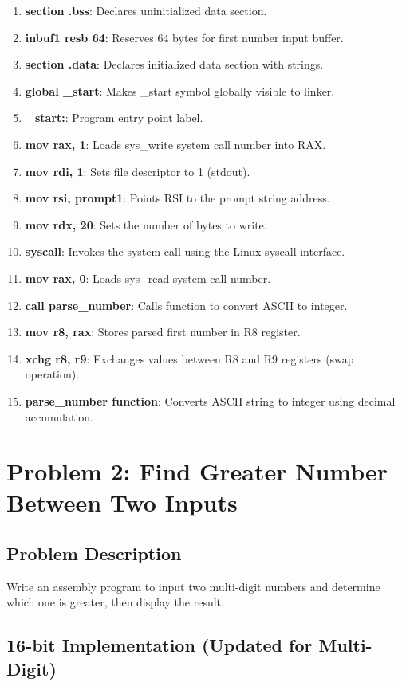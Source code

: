 \documentclass[12pt,a4paper]{article}
\begin{document}
\begin{enumerate}
\item \textbf{section .bss}: Declares uninitialized data section.
\item \textbf{inbuf1 resb 64}: Reserves 64 bytes for first number input buffer.
\item \textbf{section .data}: Declares initialized data section with strings.
\item \textbf{global \_start}: Makes \_start symbol globally visible to linker.
\item \textbf{\_start:}: Program entry point label.
\item \textbf{mov rax, 1}: Loads sys\_write system call number into RAX.
\item \textbf{mov rdi, 1}: Sets file descriptor to 1 (stdout).
\item \textbf{mov rsi, prompt1}: Points RSI to the prompt string address.
\item \textbf{mov rdx, 20}: Sets the number of bytes to write.
\item \textbf{syscall}: Invokes the system call using the Linux syscall interface.
\item \textbf{mov rax, 0}: Loads sys\_read system call number.
\item \textbf{call parse\_number}: Calls function to convert ASCII to integer.
\item \textbf{mov r8, rax}: Stores parsed first number in R8 register.
\item \textbf{xchg r8, r9}: Exchanges values between R8 and R9 registers (swap operation).
\item \textbf{parse\_number function}: Converts ASCII string to integer using decimal accumulation.
\end{enumerate}

\section{Problem 2: Find Greater Number Between Two Inputs}

\subsection{Problem Description}
Write an assembly program to input two multi-digit numbers and determine which one is greater, then display the result.

\subsection{16-bit Implementation (Updated for Multi-Digit)}
\end{document}
